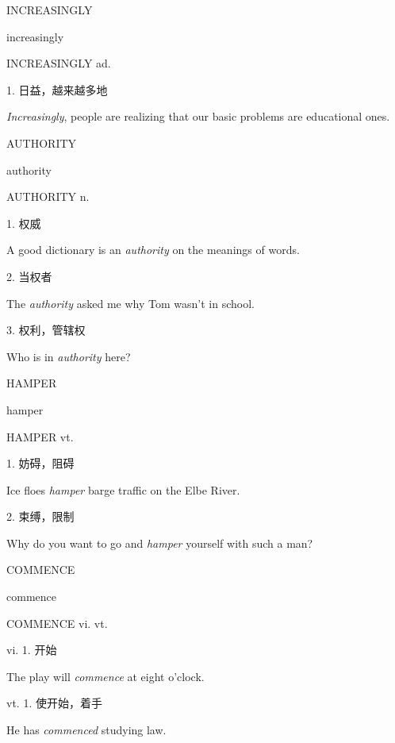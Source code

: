 \begin{flashcard}{
INCREASINGLY

increasingly
}
\begin{center}
INCREASINGLY ad. 
\end{center}
1. 日益，越来越多地

\textit{Increasingly}, people are realizing that our basic problems are educational ones.

\end{flashcard}
\begin{flashcard}{
AUTHORITY

authority
}
\begin{center}
AUTHORITY n. 
\end{center}
1. 权威

A good dictionary is an \textit{authority} on the meanings of words.

2. 当权者

The \textit{authority} asked me why Tom wasn't in school.

3. 权利，管辖权

Who is in \textit{authority} here?

\end{flashcard}
\begin{flashcard}{
HAMPER

hamper
}
\begin{center}
HAMPER vt. 
\end{center}
1. 妨碍，阻碍

Ice floes \textit{hamper} barge traffic on the Elbe River.

2. 束缚，限制

Why do you want to go and \textit{hamper} yourself with such a man?

\end{flashcard}
\begin{flashcard}{
COMMENCE

commence
}
\begin{center}
COMMENCE vi. vt. 
\end{center}
vi. 1. 开始

The play will \textit{commence} at eight o'clock.

vt. 1. 使开始，着手

He has \textit{commenced} studying law.

\end{flashcard}

